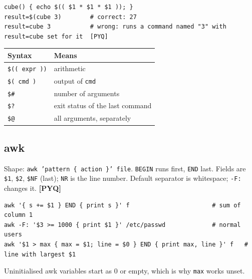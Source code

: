 \documentclass[11pt,a4paper]{article}
\newcommand{\pyq}{\textcolor{ember}{\scriptsize\textbf{[PYQ]}}}
\begin{document}
\begin{lstlisting}
cube() { echo $(( $1 * $1 * $1 )); }
result=$(cube 3)        # correct: 27
result=cube 3           # wrong: runs a command named "3" with result=cube set for it  [PYQ]
\end{lstlisting}
\begin{center}\small\renewcommand{\arraystretch}{1.18}\setlength{\tabcolsep}{9pt}
\begin{tabularx}{\linewidth}{@{}l>{\raggedright\arraybackslash}X@{}}
\toprule
\textbf{\color{slate}Syntax} & \textbf{\color{slate}Means} \\ \midrule
\texttt{\$(( expr ))} & arithmetic \\
\texttt{\$( cmd )} & output of \texttt{cmd} \\
\texttt{\$\#} & number of arguments \\
\texttt{\$?} & exit status of the last command \\
\texttt{\$@} & all arguments, separately \\
\bottomrule
\end{tabularx}\end{center}
\subsection{awk}
Shape: \texttt{awk 'pattern \{ action \}' file}. \texttt{BEGIN} runs first, \texttt{END} last. Fields are \texttt{\$1}, \texttt{\$2}, \texttt{\$NF} (last); \texttt{NR} is the line number. Default separator is whitespace; \texttt{-F:} changes it. \pyq{}

\begin{lstlisting}
awk '{ s += $1 } END { print s }' f                       # sum of column 1
awk -F: '$3 >= 1000 { print $1 }' /etc/passwd             # normal users
awk '$1 > max { max = $1; line = $0 } END { print max, line }' f   # line with largest $1
\end{lstlisting}
Uninitialised awk variables start as 0 or empty, which is why \texttt{max} works unset.
\end{document}
